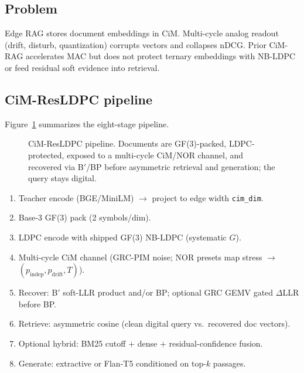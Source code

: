 \documentclass[sigconf,review,anonymous]{acmart}
\begin{document}
\subsection{Problem}
Edge RAG stores document embeddings in CiM.
Multi-cycle analog readout (drift, disturb, quantization) corrupts vectors and collapses nDCG.
Prior CiM-RAG accelerates MAC but does not protect ternary embeddings with NB-LDPC or feed residual soft evidence into retrieval.

\subsection{CiM-ResLDPC pipeline}
Figure~\ref{fig:pipeline} summarizes the eight-stage pipeline.
\begin{figure}[t]
\centering
\footnotesize
{}
\caption{CiM-ResLDPC pipeline. Documents are GF(3)-packed, LDPC-protected, exposed to a multi-cycle CiM/NOR channel, and recovered via B$'$/BP before asymmetric retrieval and generation; the query stays digital.}
\label{fig:pipeline}
\end{figure}
\begin{enumerate}
  \item Teacher encode (BGE/MiniLM) $\rightarrow$ project to edge width \texttt{cim\_dim}.
  \item Base-3 GF(3) pack (2 symbols/dim).
  \item LDPC encode with shipped GF(3) NB-LDPC (systematic $G$).
  \item Multi-cycle CiM channel (GRC-PIM noise; NOR presets map stress $\rightarrow$ $(p_{\mathrm{indep}},p_{\mathrm{drift}},T)$).
  \item Recover: B$'$ soft-LLR product and/or BP; optional GRC GEMV gated $\Delta$LLR before BP.
  \item Retrieve: asymmetric cosine (clean digital query vs.\ recovered doc vectors).
  \item Optional hybrid: BM25 cutoff $+$ dense $+$ residual-confidence fusion.
  \item Generate: extractive or Flan-T5 conditioned on top-$k$ passages.
\end{enumerate}
\end{document}
